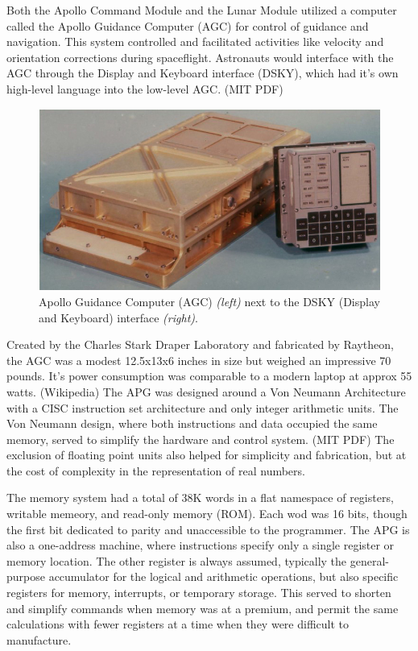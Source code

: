 \documentclass[a4paper,11pt]{article}
\begin{document}
Both the Apollo Command Module and the Lunar Module utilized a computer called the Apollo Guidance Computer (AGC) for control of guidance and navigation.  This system controlled and facilitated activities like velocity and orientation corrections during spaceflight.  Astronauts would interface with the AGC through the Display and Keyboard interface (DSKY), which had it's own high-level language into the low-level AGC.  (MIT PDF)

\begin{figure}[h!]
\caption{Apollo Guidance Computer (AGC) {\it (left)} next to the DSKY (Display and Keyboard) interface {\it (right)}.} 
\centering
\includegraphics[width=.8\textwidth]{Agc_view.jpg} 
\end{figure}
\vspace{0.02cm}

Created by the Charles Stark Draper Laboratory and fabricated by Raytheon, the AGC was a modest 12.5x13x6 inches in size but weighed an impressive 70 pounds.  It's power consumption was comparable to a modern laptop at approx 55 watts.  (Wikipedia)  The APG was designed around a Von Neumann Architecture with a CISC instruction set architecture and only integer arithmetic units.  The Von Neumann design, where both instructions and data occupied the same memory, served to simplify the hardware and control system. (MIT PDF) The exclusion of floating point units also helped for simplicity and fabrication, but at the cost of complexity in the representation of real numbers.  

The memory system had a total of 38K words in a flat namespace of registers, writable memeory, and read-only memory (ROM).  Each wod was 16 bits, though the first bit dedicated to parity and unaccessible to the programmer.  The APG is also a one-address machine, where instructions specify only a single register or memory location.  The other register is always assumed, typically the general-purpose accumulator for the logical and arithmetic operations, but also specific registers for memory, interrupts, or temporary storage.  This served to shorten and simplify commands when memory was at a premium, and permit the same calculations with fewer registers at a time when they were difficult to manufacture.  
\end{document}
